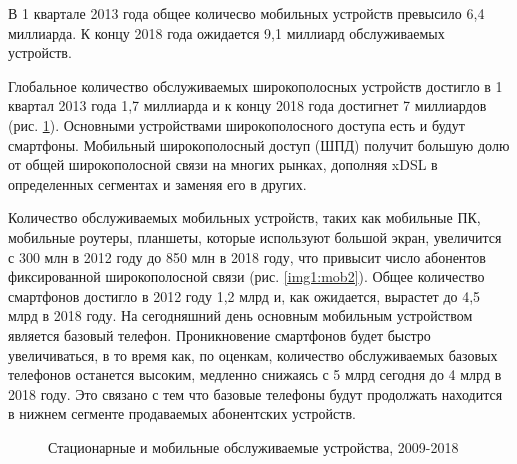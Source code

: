 В 1 квартале 2013 года общее количесво мобильных устройств превысило 6,4 миллиарда. К концу 2018 года ожидается 9,1 миллиард обслуживаемых устройств. 

Глобальное количество обслуживаемых широкополосных устройств достигло в 1 квартал 2013 года 1,7 миллиарда и к концу 2018 года достигнет 7 миллиардов (рис. \ref{img1:mob1}). Основными устройствами широкополосного доступа есть и будут смартфоны. Мобильный широкополосный доступ (ШПД) получит большую долю от общей широкополосной связи на многих рынках, дополняя xDSL в определенных сегментах и заменяя его в других. 

Количество обслуживаемых мобильных устройств, таких как мобильные ПК, мобильные роутеры, планшеты, которые используют большой экран, увеличится с 300 млн в 2012 году до 850 млн в 2018 году, что привысит число абонентов фиксированной широкополосной связи (рис. \ref{img1:mob2}).
Общее количество смартфонов достигло в 2012 году 1,2 млрд и, как ожидается, вырастет до 4,5 млрд в 2018 году. На сегодняшний день основным мобильным устройством является базовый телефон. Проникновение смартфонов будет быстро увеличиваться, в то время как, по оценкам, количество обслуживаемых базовых телефонов останется высоким, медленно снижаясь с 5 млрд сегодня до 4 млрд в 2018 году. Это связано с тем что базовые телефоны будут продолжать находится в нижнем сегменте продаваемых абонентских устройств.

\pgfplotsset{width=15cm, height=10cm, compat=1.3}
\begin{figure} [!h]
  \center
{}
\caption{Стационарные и мобильные обслуживаемые устройства, 2009-2018 \cite{ericsson}}
  \label{img1:mob1}
\end{figure}



